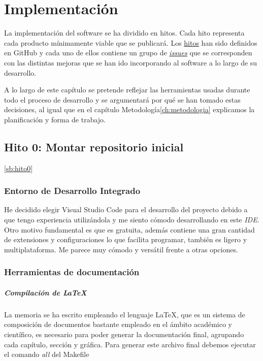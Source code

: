 \UseRawInputEncoding
\chapter{Implementación}

La implementación del software se ha dividido en hitos. Cada hito representa cada producto mínimamente viable que se publicará.
Los \href{https://github.com/RubenDelgadoPareja/TFG-Triage-Inteligente-Consulta-Medica/milestones}{hitos} han sido definidos en GitHub y
cada uno de ellos contiene un grupo de \href{https://github.com/RubenDelgadoPareja/TFG-Triage-Inteligente-Consulta-Medica/issues}{\textit{issues}} que se corresponden
con las distintas mejoras que se han ido incorporando al software a lo largo de su desarrollo.

A lo largo de este capítulo se pretende reflejar las herramientas usadas durante todo el proceso de desarrollo y
se argumentará por qué se han tomado estas decisiones, al igual que en el capítulo Metodología{\ref{ch:metodologia}} explicamos
la planificación y forma de trabajo.

\section{Hito 0: Montar repositorio inicial}\ref{sb:hito0}

\subsection{Entorno de Desarrollo Integrado}
He decidido elegir Visual Studio Code para el desarrollo del proyecto debido a que tengo experiencia utilizándola y me siento cómodo desarrollando en este {\textit{IDE}}.
Otro motivo fundamental es que es gratuita, además contiene una gran cantidad de extensiones y configuraciones lo que facilita programar, también es ligero y multiplataforma.
Me parece muy cómodo y versátil frente a otras opciones.

\subsection{Herramientas de documentación}

\paragraph*{Compilación de LaTeX}
La memoria se ha escrito empleando el lenguaje LaTeX, que es un sistema de composición de documentos bastante empleado
en el ámbito académico y científico, es necesario para poder generar la documentación final, agrupando cada capítulo, sección y
gráfica. Para generar este archivo final debemos ejecutar el comando \textit{all} del Makefile

